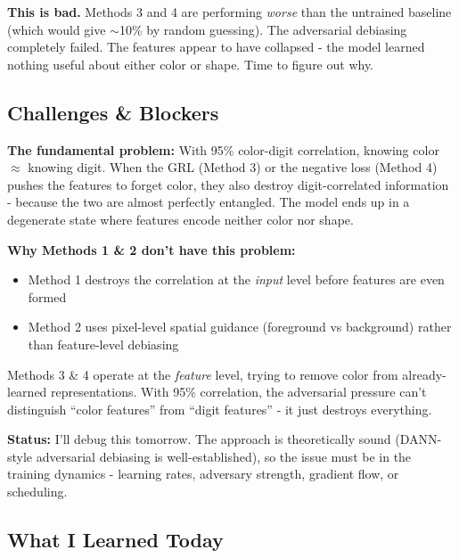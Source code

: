 \documentclass[9pt,a4paper,twocolumn,twoside]{tau-class/tau}
\begin{document}
        \begin{note}
            \textbf{This is bad.} Methods 3 and 4 are performing \textit{worse} than the untrained baseline (which would give $\sim$10\% by random guessing). The adversarial debiasing completely failed. The features appear to have collapsed - the model learned nothing useful about either color or shape. Time to figure out why.
        \end{note}

    \subsection{Challenges \& Blockers}

        \begin{tauenv}[frametitle={Challenge: Adversarial Methods Collapse with 95\% Correlation}]
            \textbf{The fundamental problem:} With 95\% color-digit correlation, knowing color $\approx$ knowing digit. When the GRL (Method 3) or the negative loss (Method 4) pushes the features to forget color, they also destroy digit-correlated information - because the two are almost perfectly entangled. The model ends up in a degenerate state where features encode neither color nor shape.

            \textbf{Why Methods 1 \& 2 don't have this problem:}
            \begin{itemize}
                \item Method 1 destroys the correlation at the \textit{input} level before features are even formed
                \item Method 2 uses pixel-level spatial guidance (foreground vs background) rather than feature-level debiasing
            \end{itemize}

            Methods 3 \& 4 operate at the \textit{feature} level, trying to remove color from already-learned representations. With 95\% correlation, the adversarial pressure can't distinguish ``color features'' from ``digit features'' - it just destroys everything.

            \textbf{Status:} I'll debug this tomorrow. The approach is theoretically sound (DANN-style adversarial debiasing is well-established), so the issue must be in the training dynamics - learning rates, adversary strength, gradient flow, or scheduling.
        \end{tauenv}

    \subsection{What I Learned Today}
\end{document}
